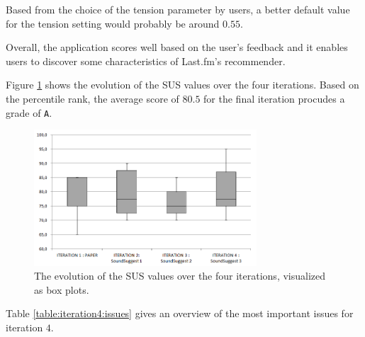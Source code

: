Based from the choice of the tension parameter by users, a better default value for the tension setting would probably be around $0.55$.



Overall, the application scores well based on the user's feedback and it enables users to discover some characteristics of Last.fm's recommender.

Figure \ref{fig:iterations_sus_scores_boxplots} shows the evolution of the SUS values over the four iterations. Based on the percentile rank, the average score of $80.5$ for the final iteration procudes a grade of \texttt{A}.

\begin{figure}
	\includegraphics[width=8.3cm]{img/iterations_sus_scores_boxplots}
	\caption{The evolution of the SUS values over the four iterations, visualized as box plots.}
	\label{fig:iterations_sus_scores_boxplots}
\end{figure}



Table \ref{table:iteration4:issues} gives an overview of the most important issues for iteration $4$.

